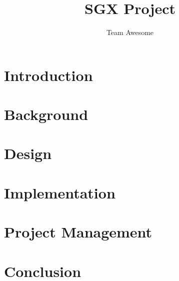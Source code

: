 \documentclass{article}
\title{SGX Project}
\author{Team Awesome}
\begin{document}
\maketitle

\newpage

\begin{abstract}
	
\end{abstract}

\newpage

\tableofcontents

\newpage

\section{Introduction}

\newpage

\section{Background}
\label{sec:background}

\newpage

\section{Design}
\label{sec:design}

\newpage

\section{Implementation}
\label{sec:implementation}


\section{Project Management}
\label{sec:projectmgmt}

\newpage

\section{Conclusion}
\label{sec:conclusion}

\newpage

\printbibliography
\end{document}
